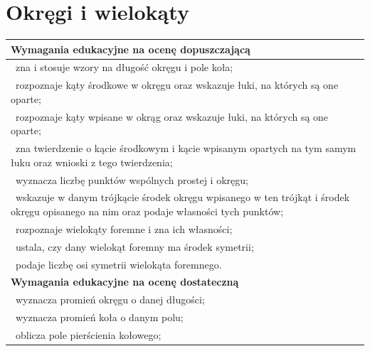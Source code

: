 \documentclass[12pt,a4paper]{article}
\begin{document}
	\section{Okręgi i wielokąty}
	
	\begin{longtable}{|p{16cm}|}
		\hline
		
		\textbf{Wymagania edukacyjne na ocenę dopuszczającą} \\ \hline
		
		\textbullet\ zna i stosuje wzory na długość okręgu i pole koła; \\
		
		\textbullet\ rozpoznaje kąty środkowe w okręgu oraz wskazuje łuki, na których są one oparte; \\
		
		\textbullet\ rozpoznaje kąty wpisane w okrąg oraz wskazuje łuki, na których są one oparte; \\
		
		\textbullet\ zna twierdzenie o kącie środkowym i kącie wpisanym opartych na tym samym łuku oraz wnioski z tego twierdzenia; \\
		
		\textbullet\ wyznacza liczbę punktów wspólnych prostej i okręgu; \\
		
		\textbullet\ wskazuje w danym trójkącie środek okręgu wpisanego w ten trójkąt i środek okręgu opisanego na nim oraz podaje własności tych punktów; \\
		
		\textbullet\ rozpoznaje wielokąty foremne i zna ich własności; \\
		
		\textbullet\ ustala, czy dany wielokąt foremny ma środek symetrii; \\
		
		\textbullet\ podaje liczbę osi symetrii wielokąta foremnego. \\ \hline
		
		\textbf{Wymagania edukacyjne na ocenę dostateczną} \\ \hline
		
		\textbullet\ wyznacza promień okręgu o danej długości; \\
		
		\textbullet\ wyznacza promień koła o danym polu; \\
		
		\textbullet\ oblicza pole pierścienia kołowego; \\
		

\end{longtable}
\end{document}
